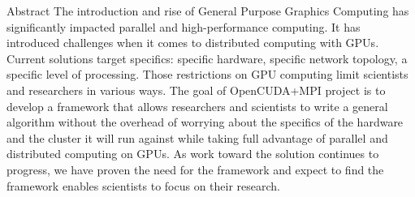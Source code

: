 \begin{block}{\Large Abstract}
The introduction and rise of General Purpose Graphics Computing has
significantly impacted parallel and high-performance computing. It has
introduced challenges when it comes to distributed computing with GPUs. Current
solutions target specifics: specific hardware, specific network topology, a
specific level of processing. Those restrictions on GPU computing limit
scientists and researchers in various ways. The goal of OpenCUDA+MPI project is
to develop a framework that allows researchers and scientists to write a
general algorithm without the overhead of worrying about the specifics of the
hardware and the cluster it will run against while taking full advantage of
parallel and distributed computing on GPUs. As work toward the solution
continues to progress, we have proven the need for the framework and expect to
find the framework enables scientists to focus on their research.
\end{block}
